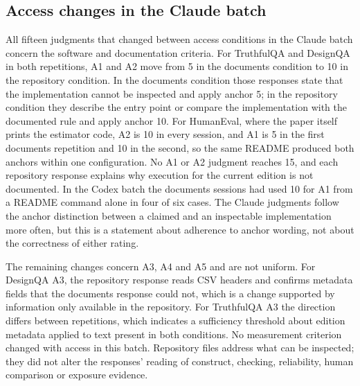 \subsection{Access changes in the Claude batch}
All fifteen judgments that changed between access conditions in the Claude batch concern the software and documentation criteria. For TruthfulQA and DesignQA in both repetitions, A1 and A2 move from 5 in the documents condition to 10 in the repository condition. In the documents condition those responses state that the implementation cannot be inspected and apply anchor 5; in the repository condition they describe the entry point or compare the implementation with the documented rule and apply anchor 10. For HumanEval, where the paper itself prints the estimator code, A2 is 10 in every session, and A1 is 5 in the first documents repetition and 10 in the second, so the same README produced both anchors within one configuration. No A1 or A2 judgment reaches 15, and each repository response explains why execution for the current edition is not documented. In the Codex batch the documents sessions had used 10 for A1 from a README command alone in four of six cases. The Claude judgments follow the anchor distinction between a claimed and an inspectable implementation more often, but this is a statement about adherence to anchor wording, not about the correctness of either rating.

The remaining changes concern A3, A4 and A5 and are not uniform. For DesignQA A3, the repository response reads CSV headers and confirms metadata fields that the documents response could not, which is a change supported by information only available in the repository. For TruthfulQA A3 the direction differs between repetitions, which indicates a sufficiency threshold about edition metadata applied to text present in both conditions. No measurement criterion changed with access in this batch. Repository files address what can be inspected; they did not alter the responses' reading of construct, checking, reliability, human comparison or exposure evidence.


